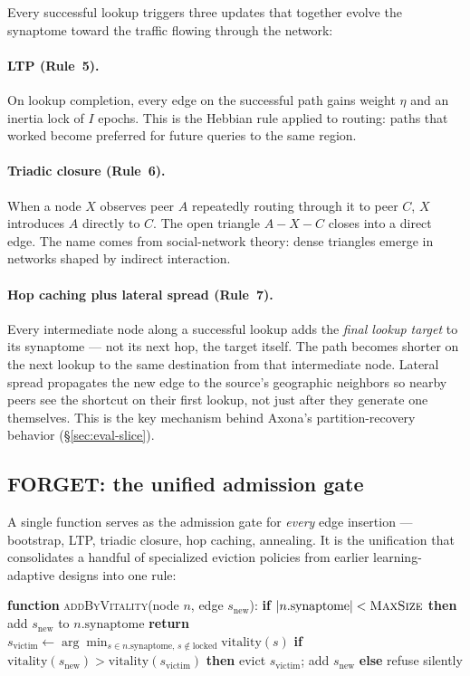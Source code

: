 \documentclass[conference]{IEEEtran}
\newcommand{\axona}{Axona\xspace}
\begin{document}
Every successful lookup triggers three updates that together
evolve the synaptome toward the traffic flowing through the
network:

\paragraph{LTP (Rule~5).}
On lookup completion, every edge on the successful path gains
weight $\eta$ and an inertia lock of $I$ epochs.  This is the
Hebbian rule applied to routing: paths that worked become
preferred for future queries to the same region.

\paragraph{Triadic closure (Rule~6).}
When a node $X$ observes peer $A$ repeatedly routing through it
to peer $C$, $X$ introduces $A$ directly to $C$.  The open
triangle $A \!-\! X \!-\! C$ closes into a direct edge.  The
name comes from social-network theory: dense triangles emerge in
networks shaped by indirect interaction.

\paragraph{Hop caching plus lateral spread (Rule~7).}
Every intermediate node along a successful lookup adds the
\emph{final lookup target} to its synaptome --- not its next
hop, the target itself.  The path becomes shorter on the next
lookup to the same destination from that intermediate node.
Lateral spread propagates the new edge to the source's
geographic neighbors so nearby peers see the shortcut on their
first lookup, not just after they generate one themselves.
This is the key mechanism behind \axona's partition-recovery
behavior (\S\ref{sec:eval-slice}).

\subsection{FORGET: the unified admission gate}
\label{sec:axona-forget}

A single function serves as the admission gate for \emph{every}
edge insertion --- bootstrap, LTP, triadic closure, hop caching,
annealing.  It is the unification that consolidates a handful of
specialized eviction policies from earlier learning-adaptive
designs into one rule:

\begin{algorithmic}
\STATE \textbf{function} \textsc{addByVitality}(node $n$, edge
$s_{\mathrm{new}}$):
\STATE \quad \textbf{if} $|n.\mathrm{synaptome}| <
\textsc{MaxSize}$ \textbf{then}
\STATE \quad \quad add $s_{\mathrm{new}}$ to
$n.\mathrm{synaptome}$
\STATE \quad \quad \textbf{return}
\STATE \quad $s_{\mathrm{victim}} \leftarrow
\arg\min_{s \in n.\mathrm{synaptome},\, s \notin
\mathrm{locked}} \mathrm{vitality}(s)$
\STATE \quad \textbf{if} $\mathrm{vitality}(s_{\mathrm{new}}) >
\mathrm{vitality}(s_{\mathrm{victim}})$ \textbf{then}
\STATE \quad \quad evict $s_{\mathrm{victim}}$; add
$s_{\mathrm{new}}$
\STATE \quad \textbf{else}
\STATE \quad \quad refuse silently
\end{algorithmic}
\end{document}
